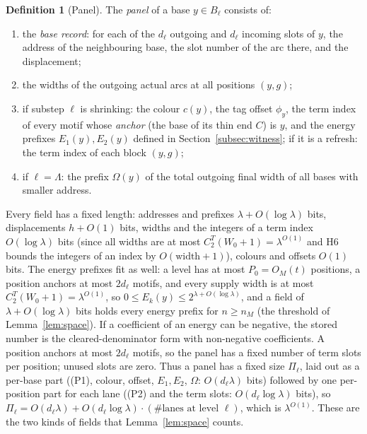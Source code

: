 \documentclass[11pt]{article}
\theoremstyle{definition}
\newtheorem{definition}[theorem]{Definition}
\theoremstyle{remark}
\begin{document}
\begin{definition}[Panel]\label{def:panel}
The \emph{panel} of a base $y\in B_\ell$ consists of:
\begin{enumerate}
\item[(P1)] the \emph{base record}: for each of the $d_\ell$ outgoing and $d_\ell$ incoming slots of $y$, the address of the
  neighbouring base, the slot number of the arc there, and the displacement;
\item[(P2)] the widths of the outgoing actual arcs at all positions $(y,g)$;
\item[(P3)] if substep $\ell$ is shrinking: the colour $c(y)$, the tag offset $\phi_y$, the term index of every motif whose
  \emph{anchor} (the base of its thin end $C$) is $y$, and the energy prefixes $E_1(y),E_2(y)$ defined in
  Section~\ref{subsec:witness}; if it is a refresh: the term index of each block $(y,g)$;
\item[(P4)] if $\ell=\Lambda$: the prefix $\Omega(y)$ of the total outgoing final width of all bases with smaller address.
\end{enumerate}
Every field has a fixed length: addresses and prefixes $\lambda+O(\log\lambda)$ bits, displacements $h+O(1)$ bits, widths and the
integers of a term index $O(\log\lambda)$ bits (since all widths are at most $C_2^T(W_0+1)=\lambda^{O(1)}$ and H6 bounds the
integers of an index by $O(\text{width}+1)$), colours and offsets $O(1)$ bits. The energy prefixes fit as well: a level has at most
$P_0=O_M(t)$ positions, a position anchors at most $2d_\ell$ motifs, and every supply width is at most
$C_2^T(W_0+1)=\lambda^{O(1)}$, so $0\le E_k(y)\le2^{\lambda+O(\log\lambda)}$, and a field of $\lambda+O(\log\lambda)$ bits holds every
energy prefix for $n\ge n_M$ (the threshold of Lemma~\ref{lem:space}). If a coefficient of an energy can be negative, the stored
number is the cleared-denominator form with non-negative coefficients. A position anchors at most $2d_\ell$ motifs, so the
panel has a fixed number of term slots per position; unused slots are zero. Thus a panel has a fixed size $\Pi_\ell$, laid out as
a per-base part ((P1), colour, offset, $E_1,E_2$, $\Omega$: $O(d_\ell\lambda)$ bits) followed by one per-position part for each lane
((P2) and the term slots: $O(d_\ell\log\lambda)$ bits), so
$\Pi_\ell=O(d_\ell\lambda)+O(d_\ell\log\lambda)\cdot(\#\text{lanes at level }\ell)$, which is $\lambda^{O(1)}$. These are the two
kinds of fields that Lemma~\ref{lem:space} counts.
\end{definition}
\end{document}
